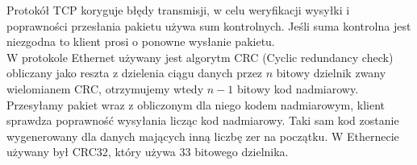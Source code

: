 Protokół TCP koryguje błędy transmisji, w celu weryfikacji wysyłki i poprawności przesłania pakietu używa sum kontrolnych. Jeśli suma kontrolna jest niezgodna to klient prosi o ponowne wysłanie pakietu.\\
W protokole Ethernet używany jest algorytm CRC (Cyclic redundancy check) obliczany jako reszta z dzielenia ciągu danych przez $n$ bitowy dzielnik zwany wielomianem CRC, otrzymujemy wtedy $n-1$ bitowy kod nadmiarowy. Przesyłamy pakiet wraz z obliczonym dla niego kodem nadmiarowym, klient sprawdza poprawność wysyłania licząc kod nadmiarowy.
Taki sam kod zostanie wygenerowany dla danych mających inną liczbę zer na początku. W Ethernecie używany był CRC32, który używa 33 bitowego dzielnika.